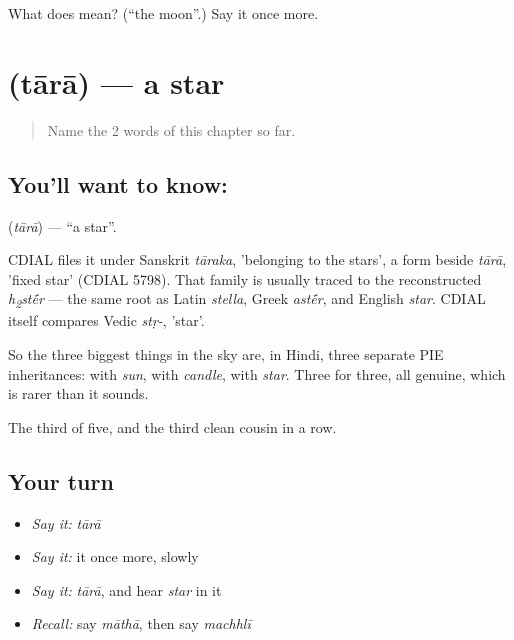 \begin{tcolorbox}[breakable,colback=teal!4,colframe=teal!35!black,title={Before you move on}]
What does  mean? (\textquotedblleft{}the moon\textquotedblright{}.) Say it once more.
\end{tcolorbox}
\section[\texorpdfstring{\hi{तारा} (tārā)}{तारा (tārā)}]{ (tārā) — a star}

\label{lesson:HI-C55-star}



\begin{quote}
Name the 2 words of this chapter so far.
\end{quote}

\subsection*{You'll want to know: }
\textbf{} (\emph{tārā}) — \textquotedblleft{}a star\textquotedblright{}.

CDIAL files it under Sanskrit \emph{tāraka}, 'belonging to the stars', a form beside \emph{tārā}, 'fixed star' (CDIAL 5798). That family is usually traced to the reconstructed \emph{h\textsubscript{2}st\'{\={e}}r} — the same root as Latin \emph{stella}, Greek \emph{ast\'{\={e}}r}, and English \emph{star}. CDIAL itself compares Vedic \emph{stṛ-}, 'star'.

So the three biggest things in the sky are, in Hindi, three separate PIE inheritances:  with \emph{sun},  with \emph{candle},  with \emph{star}. Three for three, all genuine, which is rarer than it sounds.

\begin{grammarlens}[title={What you've built}]
The third of five, and the third clean cousin in a row.
\end{grammarlens}

\subsection*{Your turn}
\begin{itemize}
\raggedright
  \item \emph{Say it:} \emph{tārā}
  \item \emph{Say it:} it once more, slowly
  \item \emph{Say it:} \emph{tārā}, and hear \emph{star} in it
  \item \emph{Recall:} say \emph{māthā}, then say \emph{machhlī}
\end{itemize}


